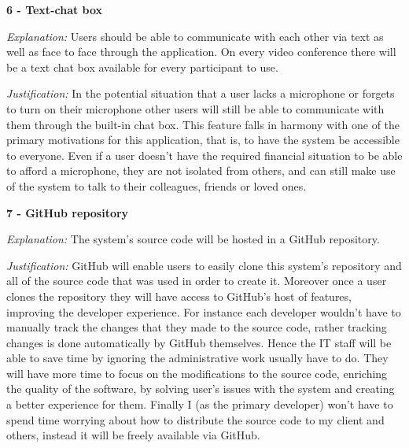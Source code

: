 \textsf{\bfseries 6 - Text-chat box} \\ \vspace{0.1cm}

\textit{Explanation:}
Users should be able to communicate with each other via text
as well as face to face through the application. On every
video conference there will be a text chat box available for
every participant to use. \vspace{0.1cm}

\textit{Justification:}
In the potential situation that a user
lacks a microphone or forgets to turn on their microphone other 
users will still be able to communicate with them through the 
built-in chat box. This feature falls in harmony with one of 
the primary motivations for this application, that is, to have 
the system be accessible to everyone. Even if a user doesn't
have the required financial situation to be able to afford a 
microphone, they are not isolated from others, and can still 
make use of the system to talk to their colleagues, friends
or loved ones. \vspace{0.2cm}

\textsf{\bfseries 7 - GitHub repository} \\ \vspace{0.1cm}

\textit{Explanation:}
The system's source code will be hosted in a GitHub
repository.
\vspace{0.1cm}

\textit{Justification:} 
GitHub will enable users to easily clone this system's repository
and all of the source code that was used in order to create it. 
Moreover once a user clones the repository they will have access
to GitHub's host of features, improving the developer experience.
For instance each developer wouldn't have to manually track the 
changes that they made to the source code, rather tracking changes
is done automatically by GitHub themselves. Hence the IT staff 
will be able to save time by ignoring the administrative work 
usually have to do. They will have more time to focus on 
the modifications to the source code, enriching the quality of 
the software, by solving user's issues with the system and 
creating a better experience for them. Finally I
(as the primary developer) won't 
have to spend time worrying about how to distribute the source
code to my client and others, instead it will be freely
available via GitHub.\\ \vspace{0.2cm}

